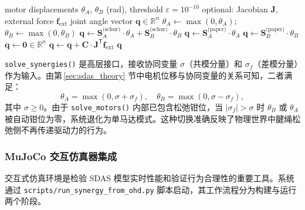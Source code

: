\begin{algorithm}[htbp]
\caption{\texttt{solve\_motors()} 的约束选择逻辑}
\label{alg:solve_motors}
\begin{algorithmic}[1]
\Require motor displacements $\theta_A$, $\theta_B$ (rad), threshold $\varepsilon = 10^{-10}$
\Require optional: Jacobian $\mathbf{J}$, external force $\mathbf{f}_{\text{ext}}$
\Ensure joint angle vector $\mathbf{q} \in \mathbb{R}^{n}$
\State $\theta_A \gets \max(0, \theta_A)$; $\theta_B \gets \max(0, \theta_B)$
    \State $\mathbf{q} \gets \mathbf{S}_A^{\text{(schur)}} \cdot \theta_A + \mathbf{S}_B^{\text{(schur)}} \cdot \theta_B$
    \State $\mathbf{q} \gets \mathbf{S}_A^{\text{(paper)}} \cdot \theta_A$
    \State $\mathbf{q} \gets \mathbf{S}_B^{\text{(paper)}} \cdot \theta_B$
\Else
    \State $\mathbf{q} \gets \mathbf{0} \in \mathbb{R}^{n}$
\EndIf
{}
    \State $\mathbf{q} \gets \mathbf{q} + \mathbf{C} \cdot \mathbf{J}^{\mathsf{T}} \mathbf{f}_{\text{ext}}$
\EndIf
\Return $\mathbf{q}$
\end{algorithmic}
\end{algorithm}

\verb|solve_synergies()| 是高层接口，接收协同变量 $\sigma$（共模分量）和 $\sigma_f$（差模分量）作为输入。由第\,\ref{sec:sdas_theory} 节中电机位移与协同变量的关系可知，二者满足：
\begin{equation}
    \theta_A = \max(0, \sigma + \sigma_f),\quad \theta_B = \max(0, \sigma - \sigma_f),
    \label{eq:sigma_to_theta}
\end{equation}
其中 $\sigma \ge 0$。由于 \texttt{solve\_motors()} 内部已包含松弛钳位，当 $|\sigma_f| > \sigma$ 时 $\theta_B$ 或 $\theta_A$ 被自动钳位为零，系统退化为单马达模式。这种切换准确反映了物理世界中腱绳松弛侧不再传递驱动力的行为。

\subsubsection{MuJoCo 交互仿真器集成}
\label{sec:mujoco_integration}

交互式仿真环境是检验 SDAS 模型实时性能和验证行为合理性的重要工具。系统通过 \texttt{scripts/run\_synergy\_from\_ohd.py} 脚本启动，其工作流程分为构建与运行两个阶段。

